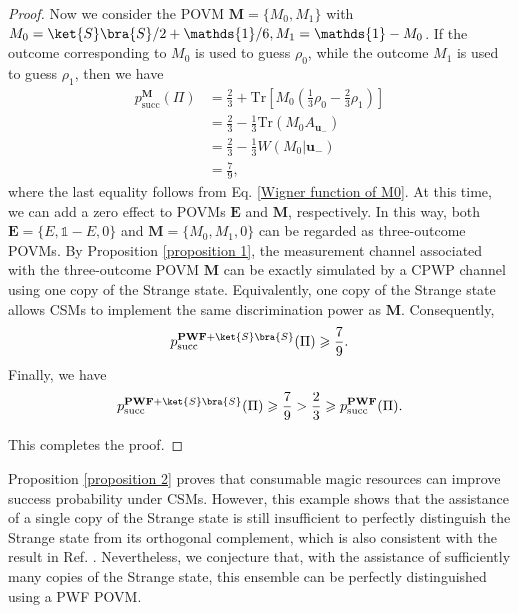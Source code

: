 \documentclass[aps,pra,twocolumn,floatfix,amsfonts,10pt]{revtex4-2}
\begin{document}
\begin{proof}
	Now we consider the POVM $\mathbf{M}=\{M_0,M_1\}$ with $M_0=\ket{S}\bra{S}/2+\mathds{1}/6, M_1=\mathds{1}-M_0$.
	If the outcome corresponding to $M_0$ is used to guess $\rho_0$, while the outcome $M_1$ is used to guess $\rho_1$, then we have
	\begin{equation}
		\begin{aligned}
			p_{\mathrm{succ}}^{\mathbf{M}}(\Pi) &= \frac{2}{3}+\mathrm{Tr}\left[M_0\left(\frac{1}{3}\rho_0 - \frac{2}{3}\rho_1\right)\right] \\ &= \frac{2}{3} - \frac{1}{3}\mathrm{Tr}(M_0A_{\mathbf{u}_-}) \\ &= \frac{2}{3}-\frac{1}{3}W(M_0|\mathbf{u}_-) \\ &= \frac{7}{9},
		\end{aligned}
	\end{equation}
	where the last equality follows from Eq. \eqref{Wigner function of M0}.
	At this time, we can add a zero effect to POVMs $\mathbf{E}$ and $\mathbf{M}$, respectively. 
	In this way, both $\mathbf{E} = \{E,\mathds{1}-E,0\}$ and $\mathbf{M} = \{M_0,M_1,0\}$ can be regarded as three-outcome POVMs.
	By Proposition \ref{proposition 1}, the measurement channel associated with the three-outcome POVM $\mathbf{M}$ can be exactly simulated by a CPWP channel using one copy of the Strange state.
	Equivalently, one copy of the Strange state allows CSMs to implement the same discrimination power as $\mathbf{M}$.
	Consequently,
	\begin{equation}
		p_{\mathrm{succ}}^{\mathbf{PWF}+\ket{S}\bra{S}}(\Pi) \geqslant \frac{7}{9}.
	\end{equation}
	Finally, we have
	\begin{equation}
		p_{\mathrm{succ}}^{\mathbf{PWF}+\ket{S}\bra{S}}(\Pi) \geqslant \frac{7}{9} > \frac{2}{3} \geqslant p_{\mathrm{succ}}^{\mathbf{PWF}}(\Pi).
	\end{equation}
	
	This completes the proof.
\end{proof}

Proposition \ref{proposition 2} proves that consumable magic resources can improve success probability under CSMs.
However, this example shows that the assistance of a single copy of the Strange state is still insufficient to perfectly distinguish the Strange state from its orthogonal complement, which is also consistent with the result in Ref. \cite{ZLZ+2024}. 
Nevertheless, we conjecture that, with the assistance of sufficiently many copies of the Strange state, this ensemble can be perfectly distinguished using a PWF POVM.
\end{document}
